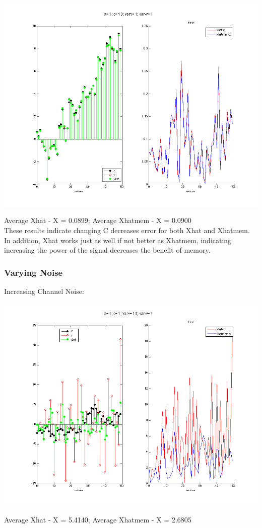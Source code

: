 \documentclass[leqno]{article}
\begin{document}
\begin{center}
\includegraphics[scale=0.3]{fig7}
\end{center}
Average Xhat - X = 0.0899; \quad Average Xhatmem - X = 0.0900\\

These results indicate changing C decreases error for both Xhat and Xhatmem. In addition, Xhat works just as well if not better as Xhatmem, indicating increasing the power of the signal decreases the benefit of memory.

\subsubsection{Varying Noise}
Increasing Channel Noise:
\begin{center}
\includegraphics[scale=0.3]{fig8}
\end{center}
Average Xhat - X = 5.4140; \quad Average Xhatmem - X = 2.6805\\
\end{document}
